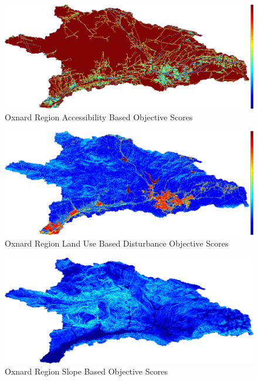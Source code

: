         \begin{figure}[!h]
            \begin{center}
            \includegraphics[width=5.5in]{figures/Oxnard_AccessibilityScore.png}   
            \caption{Oxnard Region Accessibility Based Objective Scores}
            \label{fig:Oaccessibilty}
            \end{center}
        \end{figure}

        \begin{figure}[!h]
            \begin{center}
            \includegraphics[width=5.5in]{figures/Oxnard_DisturbanceScore.png}   
            \caption{Oxnard Region Land Use Based Disturbance Objective Scores}
            \label{fig:Odisturbance}
            \end{center}
        \end{figure}
        
        \begin{figure}[!h]
            \begin{center}
            \includegraphics[width=5.5in]{figures/Oxnard_SlopeScore.png}   
            \caption{Oxnard Region Slope Based Objective Scores}
            \label{fig:Oslope}
            \end{center}
        \end{figure}
        
